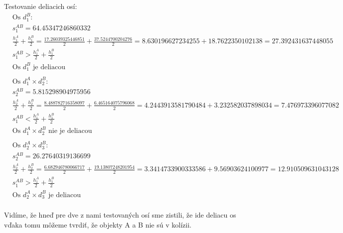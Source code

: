 \documentclass[a4paper]{article}
\begin{document}
	Testovanie deliacich osí:
	\begin{align*}
		&\text{Os $d_1^B$:}
		\\
		&s_1^{AB} = 64.45347246860332
		\\
		&\frac{h_1^A}{2} + \frac{h_1^B}{2} = \frac{17.26039325446851}{2} + \frac{37.5244700204276}{2}=
		8.630196627234255 + 18.7622350102138 =
		27.392431637448055
		\\
		&s_1^{AB} > \frac{h_1^A}{2} + \frac{h_1^B}{2}
		\\
		&\text{Os $d_1^B$ je deliacou}
		\\
		\\
		&\text{Os $d_1^A \times d_2^B$:}
		\\
		&s_2^{AB} = 5.815298904975956
		\\
		&\frac{h_2^A}{2} + \frac{h_2^B}{2} = \frac{8.488782716358097}{2} + \frac{6.465164075796068 }{2}=
		4.2443913581790484 + 3.232582037898034 =
		7.476973396077082
		\\
		&s_1^{AB} < \frac{h_1^A}{2} + \frac{h_1^B}{2}
		\\
		&\text{Os $d_1^A \times d_2^B$ nie je deliacou}
		\\
		\\
		&\text{Os $d_2^A \times d_3^B$:}
		\\
		&s_2^{AB} = 26.27640319136699
		\\
		&\frac{h_2^A}{2} + \frac{h_2^B}{2} = \frac{6.682946780066717}{2} + \frac{19.13807248201954 }{2}=
		3.3414733900333586 + 9.56903624100977 =
		12.910509631043128
		\\
		&s_1^{AB} > \frac{h_1^A}{2} + \frac{h_1^B}{2}
		\\
		&\text{Os $d_2^A \times d_3^B$ je deliacou}
		\\
	\end{align*}
	
	Vidíme, že hneď pre dve z nami testovaných osí sme zistili, že ide deliacu os vďaka tomu môžeme tvrdiť, že objekty A a B nie sú v kolízii. 
\end{document}
